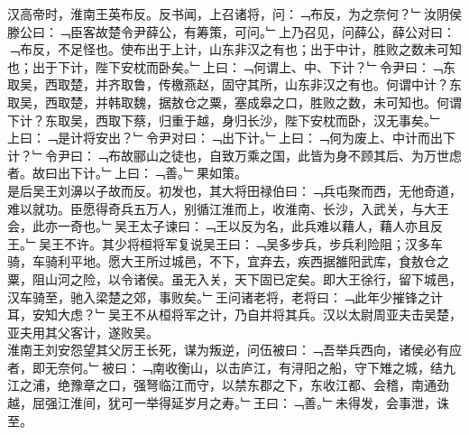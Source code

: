 {汉高帝时，淮南王英布反。反书闻，上召诸将，问：﹁布反，为之奈何？﹂汝阴侯滕公曰：﹁臣客故楚令尹薛公，有筹策，可问。﹂上乃召见，问薛公，薛公对曰：﹁布反，不足怪也。使布出于上计，山东非汉之有也；出于中计，胜败之数未可知也；出于下计，陛下安枕而卧矣。﹂上曰：﹁何谓上、中、下计？﹂令尹曰：﹁东取吴，西取楚，并齐取鲁，传檄燕赵，固守其所，山东非汉之有也。何谓中计？东取吴，西取楚，并韩取魏，据敖仓之粟，塞成皋之口，胜败之数，未可知也。何谓下计？东取吴，西取下蔡，归重于越，身归长沙，陛下安枕而卧，汉无事矣。﹂
\\
上曰：﹁是计将安出？﹂令尹对曰：﹁出下计。﹂上曰：﹁何为废上、中计而出下计？﹂令尹曰：﹁布故郦山之徒也，自致万乘之国，此皆为身不顾其后、为万世虑者。故曰出下计。﹂上曰：﹁善。﹂果如策。\\
是后吴王刘濞以子故而反。初发也，其大将田禄伯曰：﹁兵屯聚而西，无他奇道，难以就功。臣愿得奇兵五万人，别循江淮而上，收淮南、长沙，入武关，与大王会，此亦一奇也。﹂吴王太子谏曰：﹁王以反为名，此兵难以藉人，藉人亦且反王。﹂吴王不许。其少将桓将军复说吴王曰：﹁吴多步兵，步兵利险阻；汉多车骑，车骑利平地。愿大王所过城邑，不下，宜弃去，疾西据雒阳武库，食敖仓之粟，阻山河之险，以令诸侯。虽无入关，天下固已定矣。即大王徐行，留下城邑，汉车骑至，驰入梁楚之郊，事败矣。﹂王问诸老将，老将曰：﹁此年少摧锋之计耳，安知大虑？﹂吴王不从桓将军之计，乃自并将其兵。汉以太尉周亚夫击吴楚，亚夫用其父客计，遂败吴。\\
淮南王刘安怨望其父厉王长死，谋为叛逆，问伍被曰：﹁吾举兵西向，诸侯必有应者，即无奈何。﹂被曰：﹁南收衡山，以击庐江，有浔阳之船，守下雉之城，结九江之浦，绝豫章之口，强弩临江而守，以禁东郡之下，东收江都、会稽，南通劲越，屈强江淮间，犹可一举得延岁月之寿。﹂王曰：﹁善。﹂未得发，会事泄，诛至。\\
}
